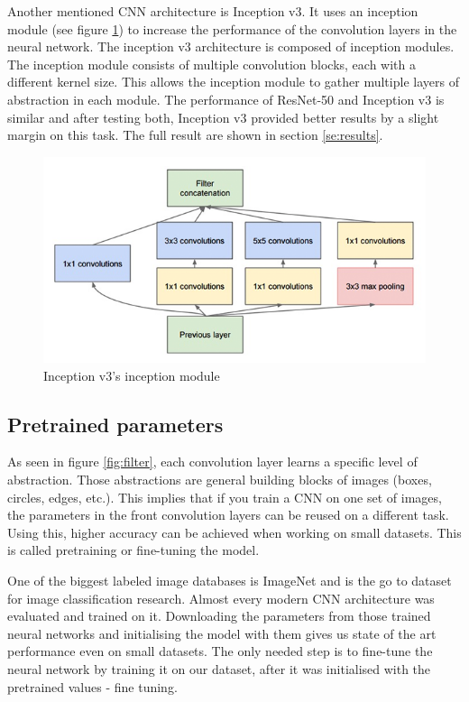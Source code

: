 \documentclass[times, utf8, diplomski]{fer}
\begin{document}
Another mentioned CNN architecture is Inception v3. It uses an inception module (see figure \ref{fig:inception_module}) to increase the performance of the convolution layers in the neural network. The inception v3 architecture is composed of inception modules. The inception module consists of multiple convolution blocks, each with a different kernel size. This allows the inception module to gather multiple layers of abstraction in each module. The performance of ResNet-50 and Inception v3 is similar and after testing both, Inception v3 provided better results by a slight margin on this task. The full result are shown in section \ref{se:results}.

\begin{figure}
  \includegraphics[scale=0.7]{figures/inception_module.png}
  \centering
  \caption{Inception v3's inception module}
  \label{fig:inception_module}
\end{figure}


\subsection{Pretrained parameters}
\label{se:pretrained_parameters}
As seen in figure \ref{fig:filter}, each convolution layer learns a specific level of abstraction. Those abstractions are general building blocks of images (boxes, circles, edges, etc.). This implies that if you train a CNN on one set of images, the parameters in the front convolution layers can be reused on a different task. Using this, higher accuracy can be achieved when working on small datasets. This is called pretraining or fine-tuning the model.

One of the biggest labeled image databases is ImageNet \citep{imagenet} and is the go to dataset for image classification research. Almost every modern CNN architecture was evaluated and trained on it. Downloading the parameters from those trained neural networks and initialising the model with them gives us state of the art performance even on small datasets. The only needed step is to fine-tune the neural network by training it on our dataset, after it was initialised with the pretrained values - fine tuning.
\end{document}
